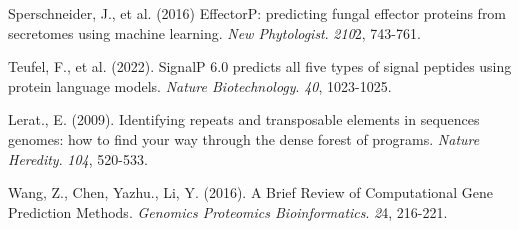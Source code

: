 \documentclass[12pt]{article}
\begin{document}
\begin{thebibliography}{99}
 Sperschneider, J., et al. (2016) EffectorP:
  predicting fungal effector proteins from secretomes using machine
  learning. \textit{New Phytologist}. \textit{210}2, 743-761.

 Teufel, F., et al. (2022). SignalP 6.0 predicts all
  five types of signal peptides using protein language
  models. \textit{Nature Biotechnology}. \textit{40}, 1023-1025.

 Lerat., E. (2009). Identifying repeats and
  transposable elements in sequences genomes: how to find your way
  through the dense forest of programs. \textit{Nature
    Heredity}. \textit{104}, 520-533.

 Wang, Z., Chen, Yazhu., Li, Y. (2016). A Brief
  Review of Computational Gene Prediction Methods. \textit{Genomics
    Proteomics Bioinformatics}. \textit{2}4, 216-221.
  
\end{thebibliography}
\end{document}
